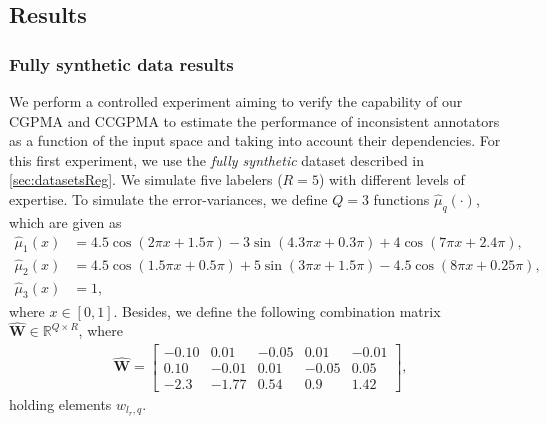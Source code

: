 \documentclass[9pt]{article}
\providecommand{\mat}[1]{{\bm{#1}}} %
\newcommand{\Real}{\mathbb{R}}
\providecommand{\mat}[1]{{\mathbf{#1}}}
\begin{document}
\subsection{Results}
\subsubsection{Fully synthetic data results }
We perform a controlled experiment aiming to verify the capability of our CGPMA and CCGPMA to estimate the performance of inconsistent annotators as a function of the input space and taking into account their dependencies. For this first experiment, we use the \textit{fully synthetic} dataset described in \cref{sec:datasetsReg}. We simulate five labelers ($R=5$) with different levels of expertise. To simulate the error-variances, we define $Q=3$ functions $\hat{\mu}_q(\cdot)$, which are given as 
\begin{align}
\label{eq:u1r}
\hat{\mu}_1(x) &= 4.5\cos(2\pi x + 1.5\pi) - 3\sin(4.3\pi x + 0.3\pi) +4\cos(7\pi x + 2.4\pi),\\
\label{eq:u2r}
 \hat{\mu}_2(x) &= 4.5\cos(1.5\pi x + 0.5\pi) + 5\sin(3\pi x + 1.5\pi) - 4.5\cos(8\pi x+ 0.25\pi),\\
\label{eq:u3r}
\hat{\mu}_3(x) &= 1,
\end{align}
where $x\in [0,1]$. Besides, we define the following combination matrix $\hat{\mat{W}} \in \Real^{Q\times R}$, where
\begin{align}
\hat{\mat{W}}=\begin{bmatrix}
-0.10  &  0.01   & -0.05 &  0.01  & -0.01\\
0.10   &  -0.01  & 0.01  &  -0.05 & 0.05\\
-2.3   &  -1.77  & 0.54  &  0.9   & 1.42
\end{bmatrix},
\label{eq:parametersP}
\end{align}
holding elements $w_{l_r,q}$.
\end{document}
